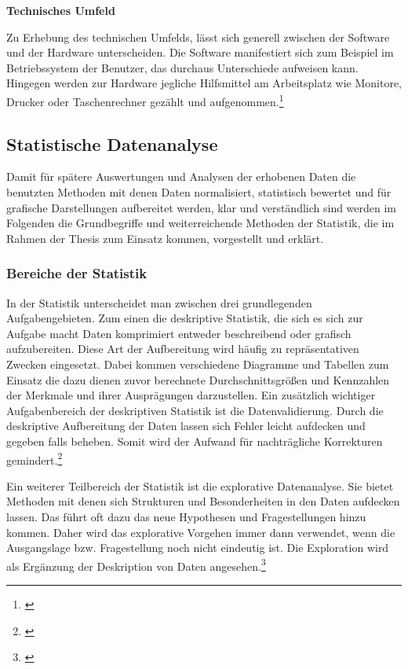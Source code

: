 \textbf{Technisches Umfeld}

Zu Erhebung des technischen Umfelds, lässt sich generell zwischen der Software und der Hardware unterscheiden. Die Software manifestiert sich zum Beispiel im Betriebssystem der Benutzer, das durchaus Unterschiede aufweisen kann. Hingegen werden zur Hardware jegliche Hilfsmittel am Arbeitsplatz wie Monitore, Drucker oder Taschenrechner gezählt und aufgenommen.\footnote{\cite[vgl.][28]{Ecker2016}}


\subsection{Statistische Datenanalyse}
Damit für spätere Auswertungen und Analysen der erhobenen Daten die benutzten Methoden mit denen Daten normalisiert, statistisch bewertet und für grafische Darstellungen aufbereitet werden, klar und verständlich sind werden im Folgenden die Grundbegriffe und weiterreichende Methoden der Statistik, die im Rahmen der Thesis zum Einsatz kommen, vorgestellt und erklärt.


\subsubsection{Bereiche der Statistik}
In der Statistik unterscheidet man zwischen drei grundlegenden Aufgabengebieten. Zum einen die deskriptive Statistik, die sich es sich zur Aufgabe macht Daten komprimiert entweder beschreibend oder grafisch aufzubereiten. Diese Art der Aufbereitung wird häufig zu repräsentativen Zwecken eingesetzt. Dabei kommen verschiedene Diagramme und Tabellen zum Einsatz die dazu dienen zuvor berechnete Durchschnittsgrößen und Kennzahlen der Merkmale und ihrer Ausprägungen darzustellen. Ein zusätzlich wichtiger Aufgabenbereich der deskriptiven Statistik ist die Datenvalidierung. Durch die deskriptive Aufbereitung der Daten lassen sich Fehler leicht aufdecken und gegeben falls beheben. Somit wird der Aufwand für nachträgliche Korrekturen gemindert.\footnote{\cite[vgl.][10\psq]{Fahrmeir2016}}

Ein weiterer Teilbereich der Statistik ist die explorative Datenanalyse. Sie bietet Methoden mit denen sich Strukturen und Besonderheiten in den Daten aufdecken lassen. Das führt oft dazu das neue Hypothesen und Fragestellungen hinzu kommen. Daher wird das explorative Vorgehen immer dann verwendet, wenn die Ausgangslage bzw. Fragestellung noch nicht eindeutig ist. Die Exploration wird als Ergänzung der Deskription von Daten angesehen.\footnote{\cite[vgl.][11\psq]{Fahrmeir2016}}

